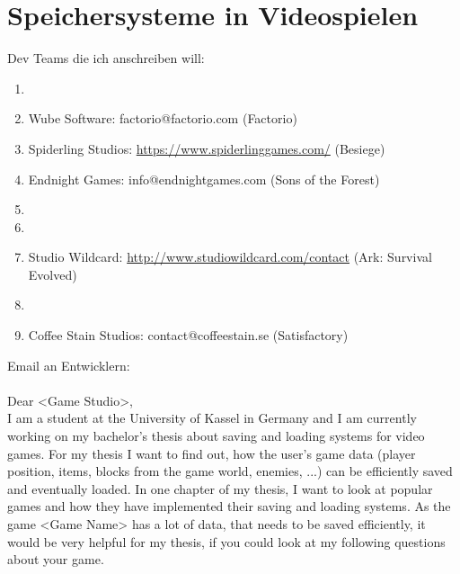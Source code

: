 \chapter{Speichersysteme in Videospielen}\label{ch:videospiele}
Dev Teams die ich anschreiben will:
\begin{enumerate}
    \item {}
    \item Wube Software: factorio@factorio.com (Factorio)
    \item Spiderling Studios: \url{https://www.spiderlinggames.com/} (Besiege)
    \item Endnight Games: info@endnightgames.com (Sons of the Forest)
    \item {}
    \item {}
    \item Studio Wildcard: \url{http://www.studiowildcard.com/contact} (Ark: Survival Evolved)
    \item {}
    \item Coffee Stain Studios: contact@coffeestain.se (Satisfactory)
\end{enumerate}

Email an Entwicklern:\\
\\
Dear <Game Studio>,\\
I am a student at the University of Kassel in Germany and I am currently working on my bachelor's thesis about saving and loading systems for video games. For my thesis I want to find out, how the user's game data (player position, items, blocks from the game world, enemies, ...) can be efficiently saved and eventually loaded. In one chapter of my thesis, I want to look at popular games and how they have implemented their saving and loading systems. As the game <Game Name> has a lot of data, that needs to be saved efficiently, it would be very helpful for my thesis, if you could look at my following questions about your game.

